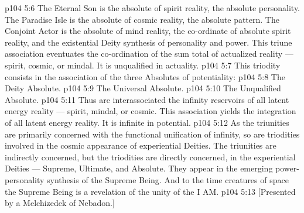 \vs p104 5:6 \pc The Eternal Son is the absolute of spirit reality, the absolute personality. The Paradise Isle is the absolute of cosmic reality, the absolute pattern. The Conjoint Actor is the absolute of mind reality, the co\hyp{}ordinate of absolute spirit reality, and the existential Deity synthesis of personality and power. This triune association eventuates the co\hyp{}ordination of the sum total of actualized reality --- spirit, cosmic, or mindal. It is unqualified in actuality.
\vs p104 5:7 \pc {} This triodity consists in the association of the three Absolutes of potentiality:
\vs p104 5:8 \bibnobreakspace The Deity Absolute.
\vs p104 5:9 \bibnobreakspace The Universal Absolute.
\vs p104 5:10 \bibnobreakspace The Unqualified Absolute.
\vs p104 5:11 \pc Thus are interassociated the infinity reservoirs of all latent energy reality --- spirit, mindal, or cosmic. This association yields the integration of all latent energy reality. It is infinite in potential.
\vs p104 5:12 \pc As the triunities are primarily concerned with the functional unification of infinity, so are triodities involved in the cosmic appearance of experiential Deities. The triunities are indirectly concerned, but the triodities are directly concerned, in the experiential Deities --- Supreme, Ultimate, and Absolute. They appear in the emerging power\hyp{}personality synthesis of the Supreme Being. And to the time creatures of space the Supreme Being is a revelation of the unity of the I AM.
\vsetoff
\vs p104 5:13 [Presented by a Melchizedek of Nebadon.]

